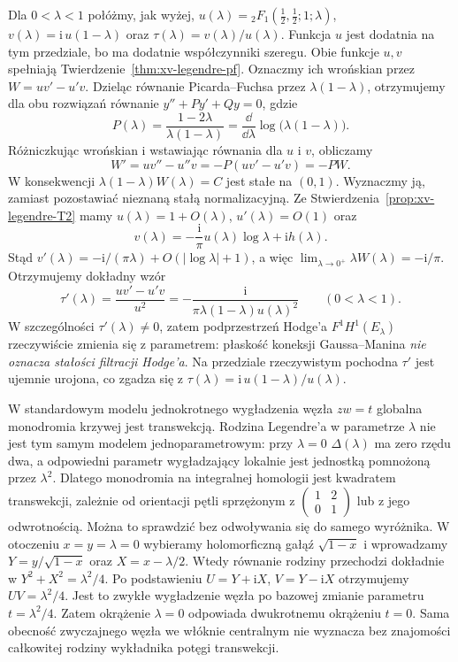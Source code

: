 \begin{przyklad}
\label{prz:xv-legendre-wronskian}
Dla $0<\lambda<1$ połóżmy, jak wyżej,
$u(\lambda)={}_2F_1(\tfrac12,\tfrac12;1;\lambda)$,
$v(\lambda)=\mathrm i\,u(1-\lambda)$
oraz $\tau(\lambda)=v(\lambda)/u(\lambda)$.
Funkcja $u$ jest dodatnia na tym przedziale,
bo ma dodatnie współczynniki szeregu.
Obie funkcje $u,v$ spełniają
Twierdzenie~\ref{thm:xv-legendre-pf}.
Oznaczmy ich wrońskian przez
$W=u v'-u'v$.
Dzieląc równanie Picarda--Fuchsa przez
$\lambda(1-\lambda)$, otrzymujemy dla obu
rozwiązań równanie $y''+P y'+Q y=0$, gdzie
\[
 P(\lambda)=\frac{1-2\lambda}{\lambda(1-\lambda)}
 =\frac{\dd}{\dd\lambda}
       \log\bigl(\lambda(1-\lambda)\bigr).
\]
Różniczkując wrońskian i wstawiając
równania dla $u$ i $v$, obliczamy
\[
 W'=uv''-u''v
 =-P(uv'-u'v)=-PW.
\]
W konsekwencji
$\lambda(1-\lambda)W(\lambda)=C$
jest stałe na $(0,1)$.
Wyznaczmy ją, zamiast pozostawiać
nieznaną stałą normalizacyjną.
Ze Stwierdzenia~\ref{prop:xv-legendre-T2}
mamy $u(\lambda)=1+O(\lambda)$,
$u'(\lambda)=O(1)$ oraz
\[
 v(\lambda)
 =-\frac{\mathrm i}{\pi}u(\lambda)
          \log\lambda+\mathrm i h(\lambda).
\]
Stąd
$v'(\lambda)=-\mathrm i/(\pi\lambda)
+O(|\log\lambda|+1)$, a więc
$\lim_{\lambda\to0^+}\lambda W(\lambda)
=-\mathrm i/\pi$.
Otrzymujemy dokładny wzór
\[
 \tau'(\lambda)
 =\frac{uv'-u'v}{u^2}
 =-\frac{\mathrm i}
 {\pi\lambda(1-\lambda)u(\lambda)^2}
 \qquad (0<\lambda<1).
\]
W szczególności $\tau'(\lambda)\ne0$,
zatem podprzestrzeń Hodge'a $F^1H^1(E_\lambda)$
rzeczywiście zmienia się z parametrem:
płaskość koneksji Gaussa--Manina
\emph{nie oznacza stałości filtracji Hodge'a}.
Na przedziale rzeczywistym pochodna $\tau'$
jest ujemnie urojona, co zgadza się z
$\tau(\lambda)=\mathrm i\,u(1-\lambda)/u(\lambda)$.
\end{przyklad}

\begin{uwaga}
W standardowym modelu jednokrotnego wygładzenia węzła
$zw=t$ globalna monodromia krzywej jest transwekcją.
Rodzina Legendre'a w parametrze $\lambda$ nie jest tym samym
modelem jednoparametrowym: przy $\lambda=0$
$\Delta(\lambda)$ ma zero rzędu dwa, a odpowiedni
parametr wygładzający lokalnie jest jednostką pomnożoną
przez $\lambda^2$. Dlatego monodromia na integralnej
homologii jest kwadratem transwekcji,
zależnie od orientacji pętli sprzężonym z
$\left(\begin{smallmatrix}1&2\\0&1\end{smallmatrix}\right)$
lub z jego odwrotnością.
Można to sprawdzić bez odwoływania się do samego
wyróżnika. W otoczeniu $x=y=\lambda=0$ wybieramy
holomorficzną gałąź $\sqrt{1-x}$ i wprowadzamy
$Y=y/\sqrt{1-x}$ oraz $X=x-\lambda/2$.
Wtedy równanie rodziny przechodzi dokładnie w
$Y^2+X^2=\lambda^2/4$.
Po podstawieniu $U=Y+\mathrm iX$, $V=Y-\mathrm iX$
otrzymujemy $UV=\lambda^2/4$. Jest to zwykłe
wygładzenie węzła po bazowej zmianie parametru
$t=\lambda^2/4$. Zatem okrążenie $\lambda=0$
odpowiada dwukrotnemu okrążeniu $t=0$.
Sama obecność zwyczajnego węzła we włóknie
centralnym nie wyznacza bez znajomości całkowitej
rodziny wykładnika potęgi transwekcji.
\end{uwaga}

